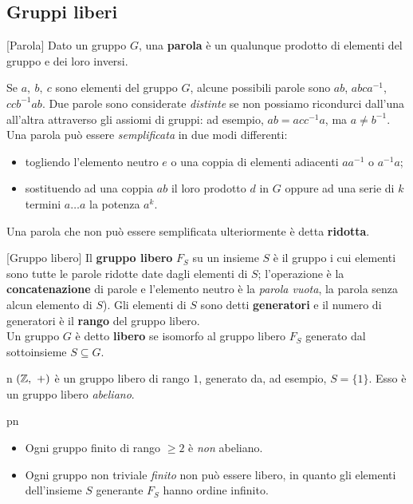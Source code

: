 \subsection{Gruppi liberi}\label{gruppolibero}
\begin{definition}{}[Parola]
	Dato un gruppo $G$, una \textbf{parola} è un qualunque prodotto di elementi del gruppo e dei loro inversi.
\end{definition}
Se $a,\ b,\ c$ sono elementi del gruppo $G$, alcune possibili parole sono $ab$, $abca^{-1}$, $ccb^{-1}ab$.  Due parole sono considerate \textit{distinte} se non possiamo ricondurci dall'una all'altra attraverso gli assiomi di gruppi: ad esempio, $ab=acc^{-1}a$, ma $a\neq b^{-1}$. Una parola può essere \textit{semplificata} in due modi differenti:
\begin{itemize}
	\item togliendo l'elemento neutro $e$ o una coppia di elementi adiacenti $aa^{-1}$ o $a^{-1}a$;
	\item sostituendo ad una coppia $ab$ il loro prodotto $d$ in $G$ oppure ad una serie di $k$ termini $a\ldots a$ la potenza $a^k$.
\end{itemize}
Una parola che non può essere semplificata ulteriormente è detta \textbf{ridotta}.
\begin{definition}{}[Gruppo libero]
Il \textbf{gruppo libero} $F_S$ su un insieme $S$ è il gruppo i cui elementi sono tutte le parole ridotte date dagli elementi di $S$; l'operazione è la \textbf{concatenazione} di parole e l'elemento neutro è la \textit{parola vuota}, la parola senza alcun elemento di $S$). Gli elementi di $S$ sono detti \textbf{generatori} e il numero di generatori è il \textbf{rango} del gruppo libero.\\
Un gruppo $G$ è detto \textbf{libero} se isomorfo al gruppo libero $F_S$ generato dal sottoinsieme $S\subseteq G$.
\end{definition}
\begin{example}{n}
	$\left(\mathbb{Z},\ +\right)$ è un gruppo libero di rango $1$, generato da, ad esempio, $S=\{1\}$. Esso è un gruppo libero \textit{abeliano}.
\end{example}
\begin{remark}{pn}~{}
	\begin{itemize}
		\item Ogni gruppo finito di rango $\geq 2$ è \textit{non} abeliano.
		\item Ogni gruppo non triviale \textit{finito} non può essere libero, in quanto gli elementi dell'insieme $S$ generante $F_S$ hanno ordine infinito. 
	\end{itemize}
\end{remark}

